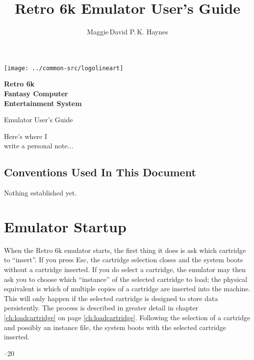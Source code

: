 \documentclass[12pt]{{memoir}}
\begin{document}
\title{Retro 6k Emulator User's Guide}
\author{Maggie\,David P.\,K. Haynes}
\pagestyle{empty}
\begin{center}
\texttt{[image: ../common-src/logolineart]}

{\sffamily\bfseries\Huge{}Retro 6k\\Fantasy Computer\\Entertainment System

Emulator User's Guide\par}
{\sffamily\bfseries\large\theauthor\par}
\end{center}
\cleartoverso
{}
\begin{center}
\noindent{}Here's where I\\
write a personal note...\par
\end{center}

\cleartorecto
\tableofcontents*
\clearpage
\pagestyle{headings}

\vspace*{3in}
\section*{Conventions Used In This Document}

Nothing established yet.

\chapter{Emulator Startup}

When the Retro 6k emulator starts, the first thing it does is ask which cartridge to ``insert''. If you press \textsf{Esc}, the cartridge selection closes and the system boots without a cartridge inserted. If you do select a cartridge, the emulator may then ask you to choose which ``instance'' of the selected cartridge to load; the physical equivalent is which of multiple copies of a cartridge are inserted into the machine. This will only happen if the selected cartridge is designed to store data persistently. The process is described in greater detail in chapter \ref{ch:loadcartridge} on page \ref{ch:loadcartridge}. Following the selection of a cartridge and possibly an instance file, the system boots with the selected cartridge inserted.

\cleartoverso
\pagestyle{empty}

\noindent\thetitle\hfill{}--20 \theauthor
\end{document}
